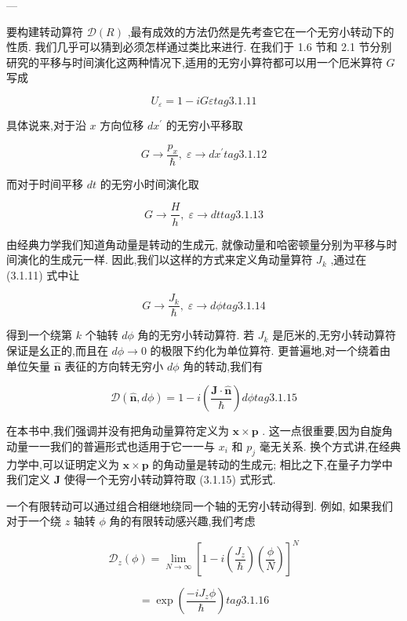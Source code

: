 ---

要构建转动算符 $\mathcal{D}\left( R\right)$ ,最有成效的方法仍然是先考查它在一个无穷小转动下的性质. 我们几乎可以猜到必须怎样通过类比来进行. 在我们于 1.6 节和 2.1 节分别研究的平移与时间演化这两种情况下,适用的无穷小算符都可以用一个厄米算符 $G$ 写成

$$
{U}_{\varepsilon } = 1 - {iG\varepsilon } tag{3.1.11}
$$

具体说来,对于沿 $x$ 方向位移 $d{x}^{\prime }$ 的无穷小平移取

$$
G \rightarrow \frac{{p}_{x}}{\hslash },\;\varepsilon \rightarrow d{x}^{\prime } tag{3.1.12}
$$

而对于时间平移 ${dt}$ 的无穷小时间演化取

$$
G \rightarrow \frac{H}{h},\;\varepsilon \rightarrow {dt} tag{3.1.13}
$$

由经典力学我们知道角动量是转动的生成元, 就像动量和哈密顿量分别为平移与时间演化的生成元一样. 因此,我们以这样的方式来定义角动量算符 ${J}_{k}$ ,通过在 (3.1.11) 式中让

$$
G \rightarrow \frac{{J}_{k}}{\hslash },\;\varepsilon \rightarrow {d\phi } tag{3.1.14}
$$

得到一个绕第 $k$ 个轴转 ${d\phi }$ 角的无穷小转动算符. 若 ${J}_{k}$ 是厄米的,无穷小转动算符保证是幺正的,而且在 ${d\phi } \rightarrow 0$ 的极限下约化为单位算符. 更普遍地,对一个绕着由单位矢量 $\widehat{\mathbf{n}}$ 表征的方向转无穷小 ${d\phi }$ 角的转动,我们有

$$
\mathcal{D}\left( {\widehat{\mathbf{n}},{d\phi }}\right) = 1 - i\left( \frac{\mathbf{J} \cdot \widehat{\mathbf{n}}}{\hslash }\right) {d\phi } tag{3.1.15}
$$

在本书中,我们强调并没有把角动量算符定义为 $\mathbf{x} \times \mathbf{p}$ . 这一点很重要,因为自旋角动量一一我们的普遍形式也适用于它一一与 ${x}_{i}$ 和 ${p}_{j}$ 毫无关系. 换个方式讲,在经典力学中,可以证明定义为 $\mathbf{x} \times \mathbf{p}$ 的角动量是转动的生成元; 相比之下,在量子力学中我们定义 $\mathbf{J}$ 使得一个无穷小转动算符取 (3.1.15) 式形式.

一个有限转动可以通过组合相继地绕同一个轴的无穷小转动得到. 例如, 如果我们对于一个绕 $z$ 轴转 $\phi$ 角的有限转动感兴趣,我们考虑

$$
{\mathcal{D}}_{z}\left( \phi \right) = \mathop{\lim }\limits_{{N \rightarrow \infty }}{\left\lbrack 1 - i\left( \frac{{J}_{z}}{\hslash }\right) \left( \frac{\phi }{N}\right) \right\rbrack }^{N}
$$

$$
= \exp \left( \frac{-i{J}_{z}\phi }{\hslash }\right) tag{3. 1.16}
$$

